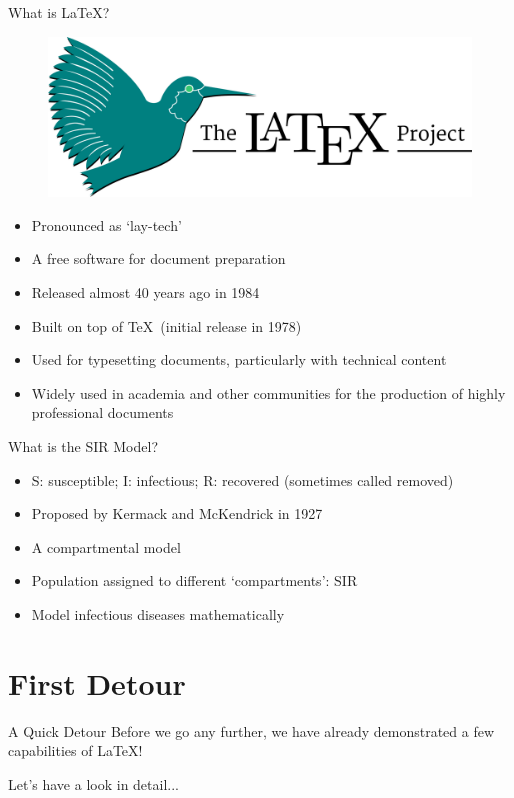 \documentclass[hyperref={breaklinks,colorlinks,
   urlcolor=blue,citecolor=blue,linkcolor=red}]{beamer}
\begin{document}
\begin{frame}{What is \LaTeX?}
\begin{figure}
\begin{center}
\includegraphics[scale=0.06]{latex-logo}
\end{center}
\end{figure}
\begin{itemize}
\item{Pronounced as `lay-tech'}
\item{A free software for document preparation}
\item{Released almost 40 years ago in 1984}
\item{Built on top of \TeX ~(initial release in 1978)}
\item{Used for typesetting documents, particularly with technical content}
\item{Widely used in academia and other communities for the production of highly professional documents} 
\end{itemize}
\end{frame}

\begin{frame}{What is the SIR Model?}
\begin{itemize}
\item{S: susceptible; I: infectious; R: recovered (sometimes called removed)}
\item{Proposed by Kermack and McKendrick in 1927~\citep{1927RSPSA.115..700K}}
\item{A compartmental model}
\item{Population assigned to different `compartments': SIR}
\item{Model infectious diseases mathematically}
\end{itemize}
\end{frame}

\section{First Detour}
\begin{frame}{A Quick Detour}
Before we go any further, we have already demonstrated
a few capabilities of \LaTeX! 
\linebreak

Let's have a look in detail...
\end{frame}
\end{document}
